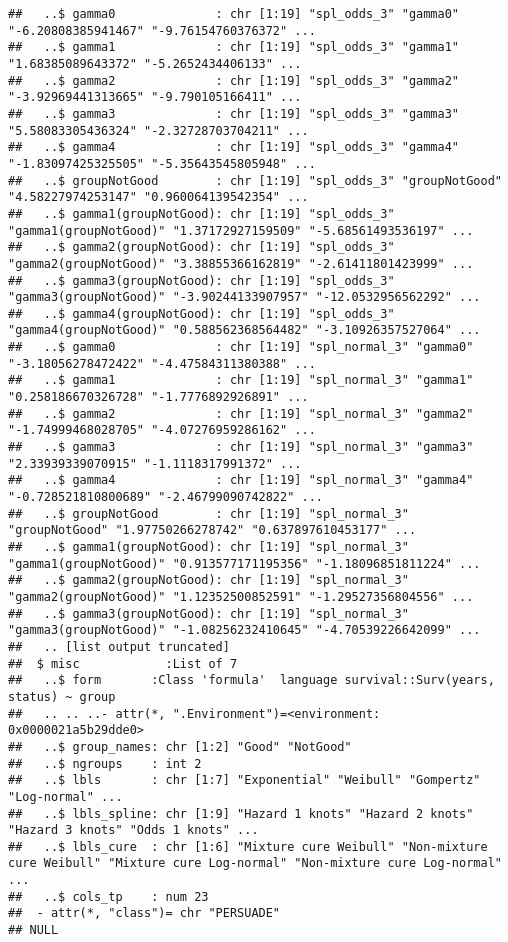 \documentclass[
]{article}
\begin{document}
\begin{verbatim}
##   ..$ gamma0              : chr [1:19] "spl_odds_3" "gamma0" "-6.20808385941467" "-9.76154760376372" ...
##   ..$ gamma1              : chr [1:19] "spl_odds_3" "gamma1" "1.68385089643372" "-5.2652434406133" ...
##   ..$ gamma2              : chr [1:19] "spl_odds_3" "gamma2" "-3.92969441313665" "-9.790105166411" ...
##   ..$ gamma3              : chr [1:19] "spl_odds_3" "gamma3" "5.58083305436324" "-2.32728703704211" ...
##   ..$ gamma4              : chr [1:19] "spl_odds_3" "gamma4" "-1.83097425325505" "-5.35643545805948" ...
##   ..$ groupNotGood        : chr [1:19] "spl_odds_3" "groupNotGood" "4.58227974253147" "0.960064139542354" ...
##   ..$ gamma1(groupNotGood): chr [1:19] "spl_odds_3" "gamma1(groupNotGood)" "1.37172927159509" "-5.68561493536197" ...
##   ..$ gamma2(groupNotGood): chr [1:19] "spl_odds_3" "gamma2(groupNotGood)" "3.38855366162819" "-2.61411801423999" ...
##   ..$ gamma3(groupNotGood): chr [1:19] "spl_odds_3" "gamma3(groupNotGood)" "-3.90244133907957" "-12.0532956562292" ...
##   ..$ gamma4(groupNotGood): chr [1:19] "spl_odds_3" "gamma4(groupNotGood)" "0.588562368564482" "-3.10926357527064" ...
##   ..$ gamma0              : chr [1:19] "spl_normal_3" "gamma0" "-3.18056278472422" "-4.47584311380388" ...
##   ..$ gamma1              : chr [1:19] "spl_normal_3" "gamma1" "0.258186670326728" "-1.7776892926891" ...
##   ..$ gamma2              : chr [1:19] "spl_normal_3" "gamma2" "-1.74999468028705" "-4.07276959286162" ...
##   ..$ gamma3              : chr [1:19] "spl_normal_3" "gamma3" "2.33939339070915" "-1.1118317991372" ...
##   ..$ gamma4              : chr [1:19] "spl_normal_3" "gamma4" "-0.728521810800689" "-2.46799090742822" ...
##   ..$ groupNotGood        : chr [1:19] "spl_normal_3" "groupNotGood" "1.97750266278742" "0.637897610453177" ...
##   ..$ gamma1(groupNotGood): chr [1:19] "spl_normal_3" "gamma1(groupNotGood)" "0.913577171195356" "-1.18096851811224" ...
##   ..$ gamma2(groupNotGood): chr [1:19] "spl_normal_3" "gamma2(groupNotGood)" "1.12352500852591" "-1.29527356804556" ...
##   ..$ gamma3(groupNotGood): chr [1:19] "spl_normal_3" "gamma3(groupNotGood)" "-1.08256232410645" "-4.70539226642099" ...
##   .. [list output truncated]
##  $ misc            :List of 7
##   ..$ form       :Class 'formula'  language survival::Surv(years, status) ~ group
##   .. .. ..- attr(*, ".Environment")=<environment: 0x0000021a5b29dde0> 
##   ..$ group_names: chr [1:2] "Good" "NotGood"
##   ..$ ngroups    : int 2
##   ..$ lbls       : chr [1:7] "Exponential" "Weibull" "Gompertz" "Log-normal" ...
##   ..$ lbls_spline: chr [1:9] "Hazard 1 knots" "Hazard 2 knots" "Hazard 3 knots" "Odds 1 knots" ...
##   ..$ lbls_cure  : chr [1:6] "Mixture cure Weibull" "Non-mixture cure Weibull" "Mixture cure Log-normal" "Non-mixture cure Log-normal" ...
##   ..$ cols_tp    : num 23
##  - attr(*, "class")= chr "PERSUADE"
## NULL
\end{verbatim}
\end{document}
